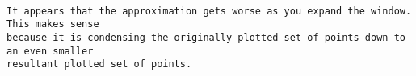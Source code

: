 \documentclass[11pt]{article}
\begin{document}
    \begin{Verbatim}[commandchars=\\\{\}]

It appears that the approximation gets worse as you expand the window. This makes sense
because it is condensing the originally plotted set of points down to an even smaller 
resultant plotted set of points.
    

    \end{Verbatim}


    
    
    
    
\end{document}
